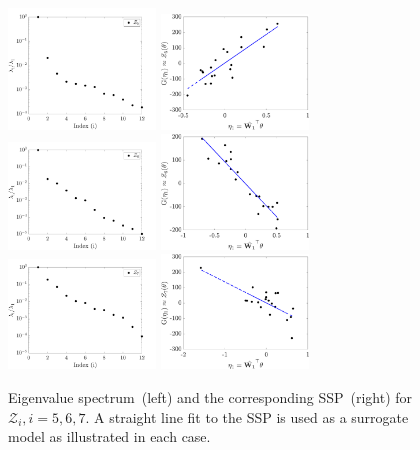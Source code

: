 \begin{figure}[htbp]
\begin{center}
\includegraphics[width=0.35\textwidth]{./Figures/eig_Zf5} 
\includegraphics[width=0.35\textwidth]{./Figures/SSP_Zf5} 
\\
\includegraphics[width=0.35\textwidth]{./Figures/eig_Zf6} 
\includegraphics[width=0.35\textwidth]{./Figures/SSP_Zf6} 
\\
\includegraphics[width=0.35\textwidth]{./Figures/eig_Zf7} 
\includegraphics[width=0.35\textwidth]{./Figures/SSP_Zf7} 
\end{center}
\caption{Eigenvalue spectrum~(left) and the corresponding SSP~(right) for $\mathcal{Z}_i, i=5,6,7$.
A straight line fit to the SSP is used as a surrogate model as illustrated in each case.}
\label{fig:as2}
\end{figure}
